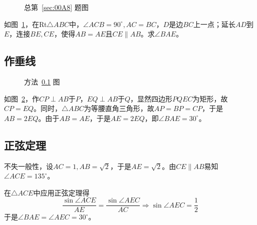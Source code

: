 

\begin{figure}[htbp]
  \centering {}
  \caption{总第~\ref{sec:00A8} 题图} \label{fig:00A8}
\end{figure}

如图~\ref{fig:00A8}，在Rt$\triangle ABC$中，$\angle ACB = 90^\circ, AC = BC$，$D$是边$BC$上一点；延长$AD$到$E$，连接$BE, CE$，使得$AB = AE$且$CE \parallel AB$。求$\angle BAE$。


\subsection{作垂线} \label{subsec:00A8-h}

\begin{figure}[htbp]
  \centering {}
  \caption{方法~\ref{subsec:00A8-h} 图} \label{fig:00A8-h}
\end{figure}

如图~\ref{fig:00A8-h}，作$CP \perp AB$于$P$，$EQ \perp AB$于$Q$，显然四边形$PQEC$为矩形，故$CP = EQ$。同时，$\triangle ABC$为等腰直角三角形，故$AP = BP = CP$，于是$AB = 2EQ$。由于$AB = AE$，于是$AE = 2EQ$，即$\angle BAE = 30^\circ$。

\subsection{正弦定理}

不失一般性，设$AC = 1, AB = \sqrt2$，于是$AE = \sqrt2$。由$CE \parallel AB$易知$\angle ACE = 135^\circ$。

在$\triangle ACE$中应用正弦定理得
\[ \frac{\sin\angle ACE}{AE} = \frac{\sin\angle AEC}{AC} \Rightarrow \sin\angle AEC = \frac12 \]
于是$\angle BAE = \angle AEC = 30^\circ$。
